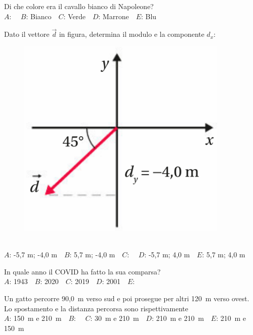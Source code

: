 \mcquestionfooter



\def\mcquestionnumber{3}


\mcquestionheader Di che colore era il cavallo bianco di Napoleone?\\
{$A$}: \ \ {$B$}: Bianco\ \ {$C$}: Verde\ \ {$D$}: Marrone\ \ {$E$}: Blu\ \ 

\mcquestionfooter



\def\mcquestionnumber{4}


\mcquestionheader Dato il vettore $\vec{d}$ in figura, determina il modulo e la componente $d_x$: \begin{figure}[h!]   \begin{center}     \includegraphics[scale=0.35]{vettored.png}   \end{center} \end{figure}\\
{$A$}: -5,7 m; -4,0 m\ \ {$B$}: 5,7 m; -4,0 m\ \ {$C$}: \ \ {$D$}: -5,7 m; 4,0 m\ \ {$E$}: 5,7 m; 4,0 m\ \ 

\mcquestionfooter



\def\mcquestionnumber{5}


\mcquestionheader In quale anno il COVID ha fatto la sua comparsa?\\
{$A$}: 1943\ \ {$B$}: 2020\ \ {$C$}: 2019\ \ {$D$}: 2001\ \ {$E$}: \ \ 

\mcquestionfooter



\def\mcquestionnumber{6}


\mcquestionheader Un gatto percorre 90,0~m verso sud e poi prosegue per altri 120~m verso ovest. Lo spostamento e la distanza percorsa sono rispettivamente\\
{$A$}: 150~m e 210~m\ \ {$B$}: \ \ {$C$}: 30~m e 210~m\ \ {$D$}: 210~m e 210~m\ \ {$E$}: 210~m e 150~m\ \ 

